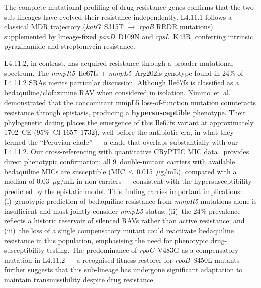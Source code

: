 \documentclass[11pt,a4paper]{article}
\newcommand{\lignee}[1]{\textsf{#1}}
\begin{document}
The complete mutational profiling of drug-resistance genes confirms that
the two sub-lineages have evolved their resistance independently.
\lignee{L4.11.1} follows a classical MDR trajectory (\textit{katG}~S315T
$\to$ \textit{rpoB} RRDR mutations) supplemented by lineage-fixed
\textit{panD}~D109N and \textit{rpsL}~K43R, conferring intrinsic
pyrazinamide and streptomycin resistance.

\lignee{L4.11.2}, in contrast,
has acquired resistance through a broader mutational spectrum.
The \textit{mmpR5}~Ile67fs + \textit{mmpL5}~Arg202fs genotype found
in 24\% of \lignee{L4.11.2} SRAs merits particular discussion.
Although Ile67fs is classified as a bedaquiline/clofazimine RAV when
considered in isolation, Nimmo~et~al.~\cite{nimmo2024} demonstrated
that the concomitant mmpL5 loss-of-function mutation counteracts
resistance through epistasis, producing a \textbf{hypersusceptible}
phenotype.  Their phylogenetic dating places the emergence of this
Ile67fs variant at approximately 1702~CE (95\%~CI 1657--1732), well
before the antibiotic era, in what they termed the ``Peruvian clade''
--- a clade that overlaps substantially with our \lignee{L4.11.2}.
Our cross-referencing with quantitative CRyPTIC MIC
data~\cite{cryptic2022} provides direct phenotypic confirmation:
all 9~double-mutant carriers with available bedaquiline MICs are
susceptible (MIC\,$\leq$\,0.015~$\mu$g/mL), compared with a median
of 0.03~$\mu$g/mL in non-carriers --- consistent with the
hypersusceptibility predicted by the epistatic model.
This finding carries important implications: (i)~genotypic prediction of
bedaquiline resistance from \textit{mmpR5} mutations alone is
insufficient and must jointly consider \textit{mmpL5} status;
(ii)~the 24\% prevalence reflects a historic reservoir of silenced RAVs
rather than active resistance; and (iii)~the loss of a single compensatory
mutant could reactivate bedaquiline resistance in this population,
emphasising the need for phenotypic drug-susceptibility testing.
The predominance of \textit{rpoC}~V483G as a
compensatory mutation in \lignee{L4.11.2} --- a recognised fitness
restorer for \textit{rpoB}~S450L mutants --- further suggests that this
sub-lineage has undergone significant adaptation to maintain
transmissibility despite drug resistance.
\end{document}
